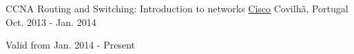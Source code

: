 \begin{cventries}
  \cventry
    {CCNA Routing and Switching: Introduction to networks} %
    {\href{https://www.cisco.com/}{Cisco}} %
    {Covilh\~a, Portugal} %
    {Oct. 2013 - Jan. 2014} %
    {
	    \begin{cvitems} %
        \item[] {Valid from Jan. 2014 - Present} %
      \end{cvitems}
    }

\end{cventries}